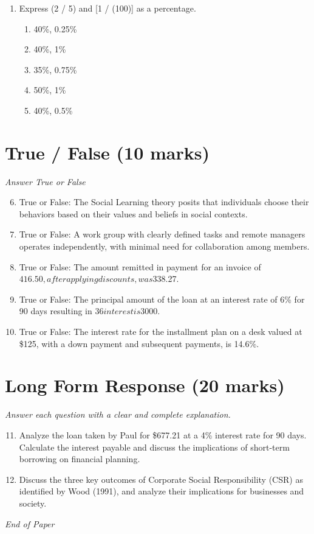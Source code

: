 \documentclass[12pt]{article}
\begin{document}
\begin{enumerate}[label=\arabic*.]
\begin{enumerate}[label=(\alph*)]
    \item \$597.50
    \item \$599.33
    \item \$596.67
    \item \$595
    \item \$604.17
\end{enumerate}
\item Express (2 / 5) and [1 / (100)] as a percentage.
\begin{enumerate}[label=(\alph*)]
    \item 40\%, 0.25\%
    \item 40\%, 1\%
    \item 35\%, 0.75\%
    \item 50\%, 1\%
    \item 40\%, 0.5\%
\end{enumerate}
\end{enumerate}

\section*{True / False (10 marks)}
\textit{Answer True or False}
\begin{enumerate}[label=\arabic*.]
\setcounter{enumi}{5}
\item True or False: The Social Learning theory posits that individuals choose their behaviors based on their values and beliefs in social contexts.
\item True or False: A work group with clearly defined tasks and remote managers operates independently, with minimal need for collaboration among members.
\item True or False: The amount remitted in payment for an invoice of $416.50, after applying discounts, was $338.27.
\item True or False: The principal amount of the loan at an interest rate of 6\% for 90 days resulting in $36 interest is $3000.
\item True or False: The interest rate for the installment plan on a desk valued at \$125, with a down payment and subsequent payments, is 14.6\%.
\end{enumerate}

\section*{Long Form Response (20 marks)}
\textit{Answer each question with a clear and complete explanation.}
\begin{enumerate}[label=\arabic*.]
\setcounter{enumi}{10}
\item Analyze the loan taken by Paul for \$677.21 at a 4\% interest rate for 90 days. Calculate
the interest payable and discuss the implications of short-term borrowing on financial
planning.
\item Discuss the three key outcomes of Corporate Social Responsibility (CSR) as identified by
Wood (1991), and analyze their implications for businesses and society.
\end{enumerate}

\vfill
\noindent\textit{End of Paper}
\end{document}
